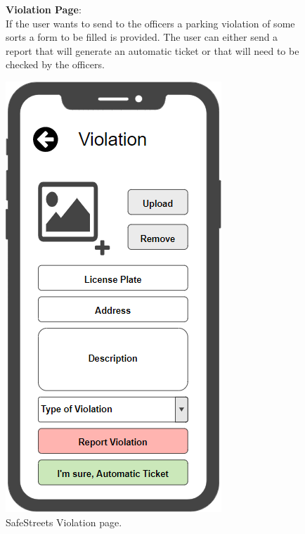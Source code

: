 \begin{figure}
	\begin{flushleft}
		\textbf{Violation Page}:\\
		If the user wants to send to the officers a parking violation of some sorts a form to be filled is provided. The user can either send a report that will generate an automatic ticket or that will need to be checked by the officers.
	\end{flushleft}
	\centering
	\includegraphics[width=0.6\linewidth]{images/mockups/violation}
	\caption{SafeStreets Violation page.}
	\label{fig:violation}
\end{figure}
\clearpage
